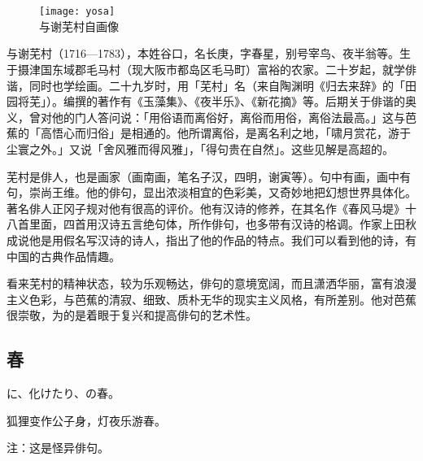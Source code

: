 \chapter[{\FM 与謝蕪村}]{\FM {}}

\begin{center}
    \begin{figure}
        \centering
        \texttt{[image: yosa]}\\[1em]
        \large{\FS 与谢芜村自画像}
    \end{figure}
\end{center}

\newpage

{\FS
    与谢芜村（1716—1783），本姓谷口，名长庚，字春星，别号宰鸟、夜半翁等。生于摄津国东域郡毛马村（现大阪市都岛区毛马町）富裕的农家。二十岁起，就学俳谐，同时也学绘画。二十九岁时，用「芜村」名（来自陶渊明《归去来辞》的「田园将芜」）。编撰的著作有《玉藻集》、《夜半乐》、《新花摘》等。后期关于俳谐的奥义，曾对他的门人答问说：「用俗语而离俗好，离俗而用俗，离俗法最高。」这与芭蕉的「高悟心而归俗」是相通的。他所谓离俗，是离名利之地，「啸月赏花，游于尘寰之外。」又说「舍风雅而得风雅」，「得句贵在自然」。这些见解是高超的。

    芜村是俳人，也是画家（画南画，笔名子汉，四明，谢寅等）。句中有画，画中有句，崇尚王维。他的俳句，显出浓淡相宜的色彩美，又奇妙地把幻想世界具体化。著名俳人正冈子规对他有很高的评价。他有汉诗的修养，在其名作《春风马堤》\footnotemark[1] 十八首里面，四首用汉诗五言绝句体，所作俳句，也多带有汉诗的格调。作家上田秋成说他是用假名写汉诗的诗人，指出了他的作品的特点。我们可以看到他的诗，有中国的古典作品情趣。

    看来芜村的精神状态，较为乐观畅达，俳句的意境宽阔，而且潇洒华丽，富有浪漫主义色彩，与芭蕉的清寂、细致、质朴无华的现实主义风格，有所差别。他对芭蕉很崇敬，为的是着眼于复兴和提高俳句的艺术性。
}

\newpage

\section{\FK 春}

\setcounter{haikucounter}{0}

\begin{haiku}
    {\FH {}に、化けたり、の春。}

    {\FK 狐狸变作公子身，灯夜乐游春。}

    {\FT 注：这是怪异俳句。}
\end{haiku}

